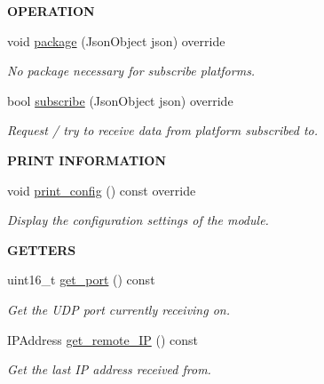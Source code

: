 \begin{Indent}{\bf O\+P\+E\+R\+A\+T\+I\+ON}\par
\begin{DoxyCompactItemize}
\item 
void \hyperlink{class_loom___max_sub_a7680cb0286f2320c68ab26242643fe64}{package} (Json\+Object json) override
\begin{DoxyCompactList}\small\item\em No package necessary for subscribe platforms. \end{DoxyCompactList}\item 
bool \hyperlink{class_loom___max_sub_ac108a85356fe7d05d7754cb56f5957b7}{subscribe} (Json\+Object json) override
\begin{DoxyCompactList}\small\item\em Request / try to receive data from platform subscribed to. \end{DoxyCompactList}\end{DoxyCompactItemize}
\end{Indent}
\begin{Indent}{\bf P\+R\+I\+NT I\+N\+F\+O\+R\+M\+A\+T\+I\+ON}\par
\begin{DoxyCompactItemize}
\item 
void \hyperlink{class_loom___max_sub_a86ebb385b46bd7d1052d98b525216657}{print\+\_\+config} () const override
\begin{DoxyCompactList}\small\item\em Display the configuration settings of the module. \end{DoxyCompactList}\end{DoxyCompactItemize}
\end{Indent}
\begin{Indent}{\bf G\+E\+T\+T\+E\+RS}\par
\begin{DoxyCompactItemize}
\item 
uint16\+\_\+t \hyperlink{class_loom___max_sub_a3ecdeac19cc208c2dc0efdcf1006c2d3}{get\+\_\+port} () const 
\begin{DoxyCompactList}\small\item\em Get the U\+DP port currently receiving on. \end{DoxyCompactList}\item 
I\+P\+Address \hyperlink{class_loom___max_sub_a8f7485cb80d7784362f265ee54a2c39e}{get\+\_\+remote\+\_\+\+IP} () const 
\begin{DoxyCompactList}\small\item\em Get the last IP address received from. \end{DoxyCompactList}\end{DoxyCompactItemize}
\end{Indent}
